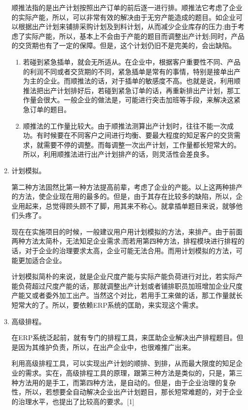 \begin{enumerate}
            顺推法指的是出产计划按照出产订单的前后逐一进行排。顺推法它考虑了企业的实际产能，所以，可以非常有效的解决由于无穷产能造成的题目。如企业可以根据出产计划来铺排采购计划及到料计划，从而减少企业库存的压力;由于考虑了实际产能，所以，基本上不会由于产能的题目而调整出产计划;同时，产品的交货期也有了一定的保障。但是，这个计划仍旧不是完美的，会出缺陷。
            \begin{enumerate}
                \item  若碰到紧急插单，就会无所适从。在企业中，根据客户重要性不同、产品的利润不同或者交货期的不同，紧急插单是常有的事情，特别是接单出产为主的企业。而顺推法的话，对于插单的敏感度不高。也就是说，利用顺推法把出产计划排好后，若碰到紧急订单的话，再重新排出产计划，那工作量会很大。一般企业的做法是，可能进行突击加班等手段，来解决这紧急订单的题目。
                \item  顺推法的工作量比较大。由于顺推法测算出产计划时，往往不能一次成功。有时候要在不同客户之间进行均衡、要最大程度的知足客户的交货需求，就需要不停的调整。而每调整一次出产计划，工作量都长短常大的。所以，利用顺推法进行出产计划排产的话，则灵活性会差良多。
            \end{enumerate}

        \item  计划模拟。

          第二种方法固然比第一种方法提高前辈，考虑了企业的产能。以上这两种排产的方法，使企业现在用的最多的。但是，由于其存在比较多的缺陷，所以，企业用起来，总觉得顾头顾不了脚，用其来不称心。就拿插单题目来说，就够他们头疼了。

            现在在实施项目的时候，一般建议用户用计划模拟的方法，来排产。由于前面两种方法太简朴，无法知足企业需求;而若用第四种方法，排程模块进行排程的话，对于企业的治理要求太高，企业可能无法合用。而用计划模拟的方法，可能更加适合企业。

            计划模拟简朴的来说，就是企业尺度产能与实际产能负荷进行对比，若实际产能负荷超过尺度产能的话，那就调整出产计划或者铺排职员加班增加企业尺度产能又或者委外加工出产。当然这个对比，若用手工来做的话，那工作量就长短常大的了。所以，要依赖ERP系统的匡助，来实现这个需求。

        \item  高级排程。

            在ERP系统泛起前，就有专门的排程工具，来匡助企业解决出产排程题目。但是因为其维护负责，所以，在出产企业中，也很难推广出来。

            利用高级排程工具，可以实现出产计划的顺排、到排，从而最大限度的知足企业的需求。实在，高级排程工具的原理，跟第三种方法是类似的，只是，第三种方法用的是手工，而第四种方法，是自动的。但是，由于企业治理的复杂性，所以，若想要全自动解决企业出产计划题目，那长短常难题的，对于企业的治理水平，也提出了比较高的要求。[1]
    \end{enumerate}


